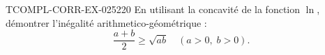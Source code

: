 \begin{exercice}{TCOMPL-CORR-EX-025}{2}{20}
En utilisant la concavité de la fonction $\ln$, démontrer l'inégalité arithmetico-géométrique :
\[ \frac{a+b}{2} \geq \sqrt{ab} \quad (a > 0,\; b > 0). \]

\end{exercice}
